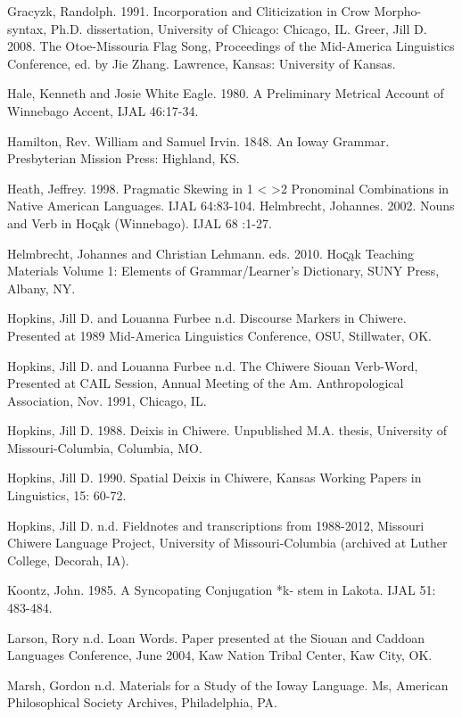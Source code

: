 \documentclass[output=paper]{LSP/langsci}
\begin{document}
\begin{reflist}
Gracyzk, Randolph. 1991. Incorporation and Cliticization in Crow Morpho-syntax, Ph.D. dissertation,	University of Chicago:  Chicago, IL.   							    
Greer, Jill D.  2008.  The Otoe-Missouria Flag Song, Proceedings of the Mid-America Linguistics Conference, ed. by Jie Zhang.  Lawrence, Kansas:  University of Kansas. 		     

Hale, Kenneth and Josie White Eagle. 1980.  A Preliminary Metrical Account of Winnebago Accent, IJAL 46:17-34.   

Hamilton, Rev. William and Samuel Irvin. 1848.  An Ioway Grammar.  Presbyterian Mission Press:  Highland, KS.    	
									   
Heath, Jeffrey. 1998. Pragmatic Skewing in 1 < >2 Pronominal Combinations in Native American Languages. IJAL 64:83-104.    					      		      
Helmbrecht, Johannes.  2002.  Nouns and Verb in Ho\k{c}\k{a}k (Winnebago). IJAL 68 :1-27.  		                        

Helmbrecht, Johannes and Christian Lehmann. eds. 2010.  Ho\k{c}\k{a}k Teaching Materials Volume 1: Elements of Grammar/Learner's Dictionary,  SUNY Press, Albany, NY.

Hopkins, Jill D. and Louanna Furbee n.d. Discourse Markers in Chiwere. Presented at 1989 Mid-America Linguistics Conference, OSU, Stillwater, OK.  	   

Hopkins, Jill D. and Louanna Furbee  n.d. The Chiwere Siouan Verb-Word, Presented at CAIL  Session, Annual Meeting of the Am. Anthropological Association, Nov. 1991,  Chicago, IL.   

Hopkins, Jill D. 1988. Deixis in Chiwere. Unpublished M.A. thesis, University of Missouri-Columbia, Columbia, MO.								  	   

Hopkins, Jill D. 1990. Spatial Deixis in Chiwere, Kansas Working Papers in Linguistics, 15: 60-72. 
 
Hopkins, Jill D. n.d.  Fieldnotes and transcriptions from 1988-2012, Missouri Chiwere Language Project, University of Missouri-Columbia (archived at Luther College, Decorah, IA).  		
 
Koontz, John. 1985. A Syncopating Conjugation *k- stem in Lakota.  IJAL 51: 483-484.           
  
Larson, Rory n.d.  Loan Words. Paper presented at the Siouan and Caddoan Languages Conference, June 2004, Kaw Nation Tribal Center, Kaw City, OK.  	
  			  	   
Marsh, Gordon  n.d.  Materials for a Study of the Ioway Language.  Ms, American Philosophical Society Archives, Philadelphia, PA.  
  									    

\end{reflist}
\end{document}
